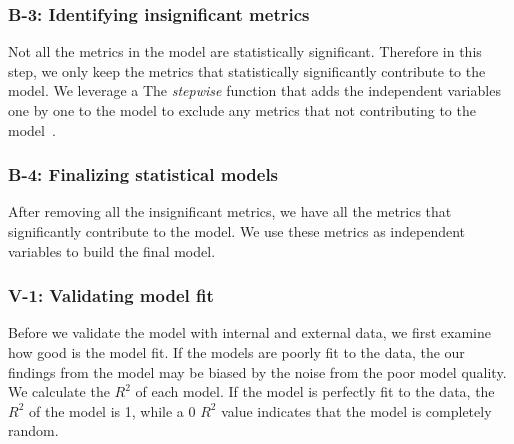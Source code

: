 \subsubsection{B-3: Identifying insignificant metrics}
Not all the metrics in the model are statistically significant. Therefore in this step, we only keep the metrics that statistically significantly contribute to the model. We leverage a The \textit{stepwise} function that adds the independent variables one by one to the model to exclude any metrics that not contributing to the model~\cite{RInAction}. 

\subsubsection{B-4: Finalizing statistical models}
After removing all the insignificant metrics, we have all the metrics that significantly contribute to the model. We use these metrics as independent variables to build the final model.

\subsubsection{V-1: Validating model fit}

Before we validate the model with internal and external data, we first examine how good is the model fit. If the models are poorly fit to the data, the our findings from the model may be biased by the noise from the poor model quality. We calculate the $R^2$ of each model. If the model is perfectly fit to the data, the $R^2$ of the model is 1, while a 0 $R^2$ value indicates that the model is completely random.


